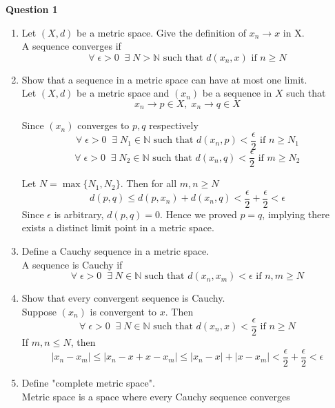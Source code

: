 \documentclass[12pt]{article}
\begin{document}
{\bf Question 1}
\begin{enumerate}[label=(\roman*)]
    \item Let $(X, d)$ be a metric space. Give the definition of $x_n\to x$ in X.\\
    
    A sequence converges if 
    $$\forall\; \epsilon>0\;\; \exists\;N>\mathbb{N} \text{ such that } d(x_n,x) \text{ if $n\ge N $}    $$
    
    \item Show that a sequence in a metric space can have at most one limit.\\
    
    Let $(X,d)$ be a metric space and $(x_n)$ be a sequence in $X$ such that
    $$x_n\to p\in X,\; x_n\to q\in X$$
    
    Since $(x_n)$ converges to $p,q$ respectively
    $$\forall\;\epsilon>0\;\;\exists\;N_1\in\mathbb{N} \text{ such that } d(x_n,p)<\frac{\epsilon}{2} \text{ if } n\ge N_1 $$
    $$\forall\;\epsilon>0\;\;\exists\;N_2\in\mathbb{N} \text{ such that } d(x_n,q)<\frac{\epsilon}{2} \text{ if } m\ge N_2 $$
    
    Let $N=\max\{N_1,N_2\}$. Then for all $m,n\ge N$
    $$d(p,q) \le d(p,x_n)+d(x_n,q) < \frac{\epsilon}{2}+\frac{\epsilon}{2} < \epsilon  $$
    Since $\epsilon$ is arbitrary, $d(p,q)=0$. Hence we proved $p=q$, implying there exists a distinct limit point in a metric space.
    
    \item Define a Cauchy sequence in a metric space.\\
    
    A sequence is Cauchy if 
    $$\forall\;\epsilon>0\;\;\exists\;N\in\mathbb{N}\text{ such that } d(x_n,x_m)<\epsilon \text{ if $n,m\ge N$} $$
    
    \item Show that every convergent sequence is Cauchy.\\
    
    Suppose $(x_n)$ is convergent to $x$. Then
    $$\forall\;\epsilon>0\;\;\exists\;N\in\mathbb{N} \text{ such that } d(x_n,x)<\frac{\epsilon}{2} \text{ if } n\ge N $$
    If $m,n \le N$, then
    $$|x_n-x_m| \le |x_n-x+x-x_m| \le |x_n-x|+|x-x_m| < \frac{\epsilon}{2}+\frac{\epsilon}{2}<\epsilon    $$
    \item Define "complete metric space".\\
    Metric space is a space where every Cauchy sequence converges
    

\end{enumerate}
\end{document}
